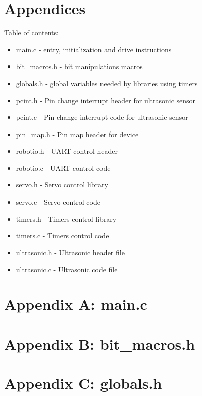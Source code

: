 \documentclass[letterpaper,11pt]{texMemo} %
\begin{document}
\newpage
\section*{Appendices}
Table of contents:
\begin{itemize}
    \item main.c - entry, initialization and drive instructions
    \item bit\_macros.h - bit manipulations macros
    \item globals.h - global variables needed by libraries using timers
    \item pcint.h - Pin change interrupt header for ultrasonic sensor
    \item pcint.c - Pin change interrupt code for ultrasonic sensor
    \item pin\_map.h - Pin map header for device
    \item robotio.h - UART control header
    \item robotio.c - UART control code
    \item servo.h - Servo control library
    \item servo.c - Servo control code
    \item timers.h - Timers control library
    \item timers.c - Timers control code
    \item ultrasonic.h - Ultrasonic header file
    \item ultrasonic.c - Ultrasonic code file
\end{itemize}
\newpage

\section*{Appendix A: main.c}
\begin{tiny}

\end{tiny}
\newpage

\section*{Appendix B: bit\_macros.h}
\begin{tiny}

\end{tiny}
\newpage

\section*{Appendix C: globals.h}
\begin{tiny}

\end{tiny}
\newpage
\end{document}
